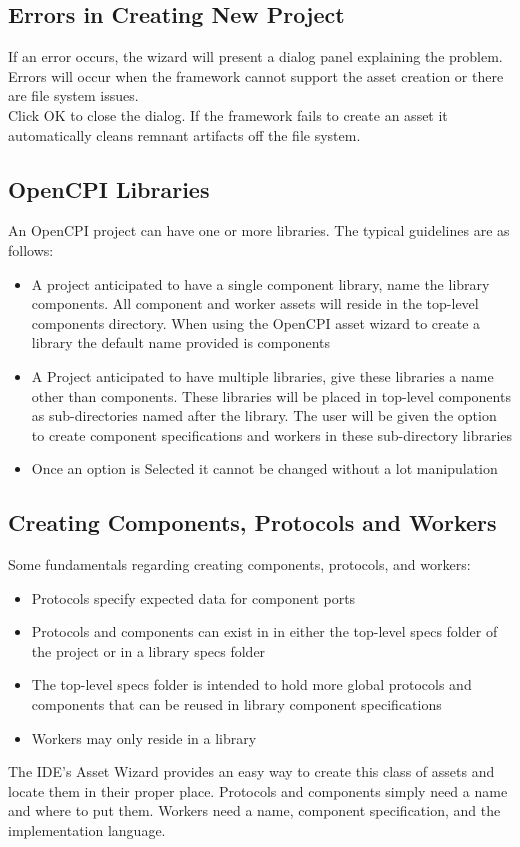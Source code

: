 \documentclass[10pt, a4paper, oneside]{article}
\begin{document}
\subsection{Errors in Creating New Project}
If an error occurs, the wizard will present a dialog panel explaining the problem. Errors will occur when the framework cannot support the asset creation or there are file system issues. \\

Click OK to close the dialog. If the framework fails to create an asset it automatically cleans remnant artifacts off the file system.
\subsection{OpenCPI Libraries}
An OpenCPI project can have one or more libraries. The typical guidelines are as follows:
\begin{itemize}
\item A project anticipated to have a single component library, name the library components. All component and worker assets will reside in the top-level components directory. When using the OpenCPI asset wizard to create a library the default name provided is components
\item A Project anticipated to have multiple libraries, give these libraries a name other than components. These libraries will be placed in top-level components as sub-directories named after the library. The user will be given the option to create component specifications and workers in these sub-directory libraries
\item Once an option is Selected it cannot be changed without a lot manipulation
\end{itemize}
\subsection{Creating Components, Protocols and Workers}
Some fundamentals regarding creating components, protocols, and workers:
\begin{itemize}
\item Protocols specify expected data for component ports
\item Protocols and components can exist in in either the top-level specs folder of the project or in a library specs folder
\item The top-level specs folder is intended to hold more global protocols and components that can be reused in library component specifications
\item Workers may only reside in a library
\end{itemize}
The IDE’s Asset Wizard provides an easy way to create this class of assets and locate them in their proper place. Protocols and components simply need a name and where to put them. Workers need a name, component specification, and the implementation language.
\end{document}
